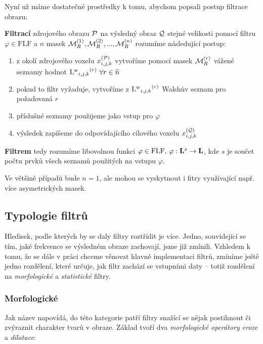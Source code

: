     Nyní už máme dostatečné prostředky k tomu, abychom popsali postup filtrace obrazu:
    \begin{define}\label{def filtr}
      \textbf{Filtrací} zdrojového obrazu $\mathcal{P}$ na výsledný obraz $\mathcal{Q}$ stejné velikosti pomocí filtru $\varphi \in \mathrm{FLF}$ a $n$ masek $\mathcal{M}_R^{(1)},\mathcal{M}_R^{(2)},...,\mathcal{M}_R^{(n)}$ rozumíme následující postup:
      \begin{enumerate}
      \item z okolí zdrojového voxelu $x_{i,j,k}^{(\mathcal{P})}$ vytvoříme pomocí masek $\mathcal{M}_R^{(r)}$ vážené seznamy hodnot ${\mathrm{L^w}_{i,j,k}}^{(r)} \,\, \forall r \in \widehat n$
      \item pokud to filtr vyžaduje, vytvoříme z ${\mathrm{L^w}_{i,j,k}}^{(r)}$ Walshův seznam pro požadovaná $r$
      \item příslušné seznamy použijeme jako vstup pro $\varphi$
      \item výsledek zapíšeme do odpovídajícího cílového voxelu $x_{i,j,k}^{(\mathcal{Q})}$
      \end{enumerate}
      \textbf{Filtrem} tedy rozumíme libovolnou funkci $\varphi \in \mathrm{FLF}, \,\varphi : \mathbf{L}^s \rightarrow \mathbf{L}$, kde $s$ je součet počtu prvků všech seznamů použitých na vstupu $\varphi$.
    \end{define}

    Ve většině případů bude $n = 1$, ale mohou se vyskytnout i fitry využívající např. více asymetrických masek.

    \subsection{Typologie filtrů}\label{Typologie}       %

    Hledisek, podle kterých by se daly filtry roztřídit je více. Jedno, souvidející se tím, jaké frekvence se výsledném obraze zachovají, jsme již zmínili. Vzhledem k tomu, že se dále v práci chceme věnovat hlavně implementaci filtrů, zmíníme ještě jedno rozdělení, které určuje, jak filtr zachází se vstupními daty -- totiž rozdělení na \emph{morfologické} a \emph{statistické} filtry.

        \subsubsection{Morfologické}
        Jak název napovídá, do této kategorie patří filtry snažící se nějak postihnout či zvýraznit charakter tvarů v obraze. Základ tvoří dva \emph{morfologické operátory} \emph{eroze} a \emph{dilatace}:

